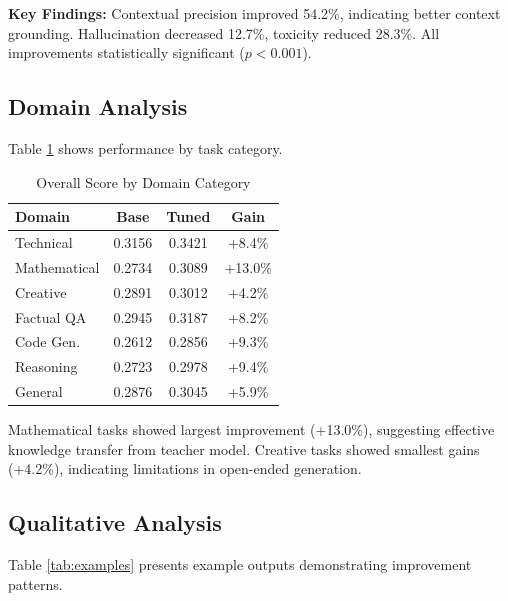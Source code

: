 \documentclass[conference]{IEEEtran}
\begin{document}
\textbf{Key Findings:} Contextual precision improved 54.2\%, indicating better context grounding. Hallucination decreased 12.7\%, toxicity reduced 28.3\%. All improvements statistically significant ($p < 0.001$).

\subsection{Domain Analysis}

Table \ref{tab:domain_results} shows performance by task category.

\begin{table}[htbp]
\caption{Overall Score by Domain Category}
\begin{center}
\begin{tabular}{lccc}
\toprule
\textbf{Domain} & \textbf{Base} & \textbf{Tuned} & \textbf{Gain} \\
\midrule
Technical & 0.3156 & 0.3421 & +8.4\% \\
Mathematical & 0.2734 & 0.3089 & +13.0\% \\
Creative & 0.2891 & 0.3012 & +4.2\% \\
Factual QA & 0.2945 & 0.3187 & +8.2\% \\
Code Gen. & 0.2612 & 0.2856 & +9.3\% \\
Reasoning & 0.2723 & 0.2978 & +9.4\% \\
General & 0.2876 & 0.3045 & +5.9\% \\
\bottomrule
\end{tabular}
\label{tab:domain_results}
\end{center}
\end{table}

Mathematical tasks showed largest improvement (+13.0\%), suggesting effective knowledge transfer from teacher model. Creative tasks showed smallest gains (+4.2\%), indicating limitations in open-ended generation.

\subsection{Qualitative Analysis}

Table \ref{tab:examples} presents example outputs demonstrating improvement patterns.
\end{document}
